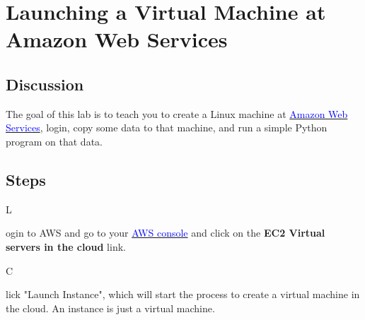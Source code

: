 \documentclass[titlepage]{tufte-book}
\newcounter{problem}
\newcommand{\step}[1]{{}
\vspace{4pt} \noindent {\bf \theproblem. }#1\addtocounter{problem}{1}}
\begin{document}
\chapter{Launching a Virtual Machine at Amazon Web Services}
\label{ch:1}

\setcounter{problem}{1}

\section{Discussion}

\begin{fullwidth}

The goal of this lab is to teach you to create a Linux machine at \href{http://aws.amazon.com}{\textcolor{blue}{Amazon Web Services}}, login, copy some data to that machine, and run a simple Python program on that data.

\section{Steps}

\step Login to AWS and go to your \href{http://aws.amazon.com/console/}{\textcolor{blue}{AWS console}} and click on the {\bf EC2 Virtual servers in the cloud} link.


\step Click "Launch Instance", which will start the process to create a virtual machine in the cloud. An instance is just a virtual machine.



\end{fullwidth}
\end{document}
